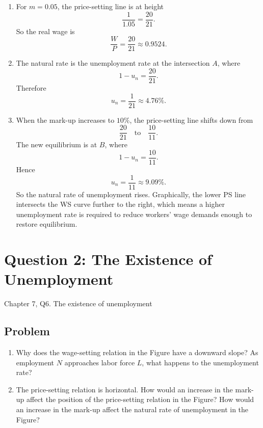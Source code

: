 \documentclass[12pt]{article}
\begin{document}
\begin{enumerate}[label=(\alph*)]
    \item
    For \(m=0.05\), the price-setting line is at height
    \[
    \frac{1}{1.05}=\frac{20}{21}.
    \]
    So the real wage is
    \[
    \boxed{\frac{W}{P}=\frac{20}{21}\approx 0.9524.}
    \]

    \item
    The natural rate is the unemployment rate at the intersection \(A\), where
    \[
    1-u_n=\frac{20}{21}.
    \]
    Therefore
    \[
    \boxed{u_n=\frac{1}{21}\approx 4.76\%.}
    \]

    \item
    When the mark-up increases to \(10\%\), the price-setting line shifts down from
    \[
    \frac{20}{21}
    \quad\text{to}\quad
    \frac{10}{11}.
    \]
    The new equilibrium is at \(B\), where
    \[
    1-u_n=\frac{10}{11}.
    \]
    Hence
    \[
    \boxed{u_n=\frac{1}{11}\approx 9.09\%.}
    \]
    So the natural rate of unemployment rises. Graphically, the lower PS line intersects the WS curve further to the right, which means a higher unemployment rate is required to reduce workers' wage demands enough to restore equilibrium.
\end{enumerate}

\newpage
\section{Question 2: The Existence of Unemployment}

\noindent
Chapter 7, Q6. The existence of unemployment

\subsection{Problem}
\begin{enumerate}[label=(\alph*)]
    \item Why does the wage-setting relation in the Figure have a downward slope? As employment \(N\) approaches labor force \(L\), what happens to the unemployment rate?
    \item The price-setting relation is horizontal. How would an increase in the mark-up affect the position of the price-setting relation in the Figure? How would an increase in the mark-up affect the natural rate of unemployment in the Figure?
\end{enumerate}
\end{document}

